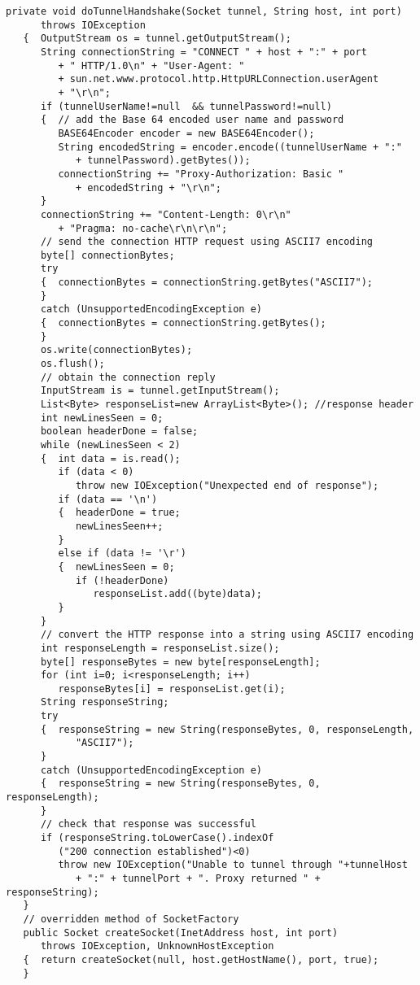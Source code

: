 \begin{lstlisting}[caption=SSL tunneling]
   private void doTunnelHandshake(Socket tunnel, String host, int port)
      throws IOException
   {  OutputStream os = tunnel.getOutputStream();
      String connectionString = "CONNECT " + host + ":" + port
         + " HTTP/1.0\n" + "User-Agent: "
         + sun.net.www.protocol.http.HttpURLConnection.userAgent
         + "\r\n";
      if (tunnelUserName!=null  && tunnelPassword!=null)
      {  // add the Base 64 encoded user name and password
         BASE64Encoder encoder = new BASE64Encoder();
         String encodedString = encoder.encode((tunnelUserName + ":"
            + tunnelPassword).getBytes());
         connectionString += "Proxy-Authorization: Basic "
            + encodedString + "\r\n";
      }
      connectionString += "Content-Length: 0\r\n"
         + "Pragma: no-cache\r\n\r\n";
      // send the connection HTTP request using ASCII7 encoding
      byte[] connectionBytes;
      try
      {  connectionBytes = connectionString.getBytes("ASCII7");
      }
      catch (UnsupportedEncodingException e)
      {  connectionBytes = connectionString.getBytes();
      }
      os.write(connectionBytes);
      os.flush();
      // obtain the connection reply
      InputStream is = tunnel.getInputStream();
      List<Byte> responseList=new ArrayList<Byte>(); //response header
      int newLinesSeen = 0;
      boolean headerDone = false;
      while (newLinesSeen < 2)
      {  int data = is.read();
         if (data < 0)
            throw new IOException("Unexpected end of response");
         if (data == '\n')
         {  headerDone = true;
            newLinesSeen++;
         }
         else if (data != '\r')
         {  newLinesSeen = 0;
            if (!headerDone)
               responseList.add((byte)data);
         }
      }
      // convert the HTTP response into a string using ASCII7 encoding
      int responseLength = responseList.size();
      byte[] responseBytes = new byte[responseLength];
      for (int i=0; i<responseLength; i++)
         responseBytes[i] = responseList.get(i);
      String responseString;
      try
      {  responseString = new String(responseBytes, 0, responseLength,
            "ASCII7");
      }
      catch (UnsupportedEncodingException e)
      {  responseString = new String(responseBytes, 0, responseLength);
      }
      // check that response was successful
      if (responseString.toLowerCase().indexOf
         ("200 connection established")<0)
         throw new IOException("Unable to tunnel through "+tunnelHost
            + ":" + tunnelPort + ". Proxy returned " + responseString);
   }
   // overridden method of SocketFactory
   public Socket createSocket(InetAddress host, int port)
      throws IOException, UnknownHostException
   {  return createSocket(null, host.getHostName(), port, true);
   }


\end{lstlisting}
